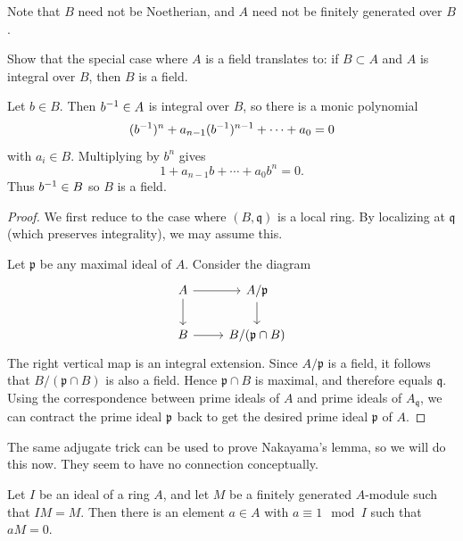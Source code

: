 \documentclass[12pt]{article}
\begin{document}
Note that $B$ need not be Noetherian, and $A$ need not be finitely generated over $B$.



\begin{exercise}
    Show that the special case where $A$ is a field translates to: if $B \subset A$ and $A$ is integral over $B$, then $B$ is a field.
\end{exercise}

\begin{solution}
    Let $b\in B$. Then ${b}^{-1}\in A$ is integral over $B$, so there is a monic polynomial
    \[({b}^{-1})^n + a_{n-1}({b}^{-1})^{n-1} + \cdots + a_0 = 0\]
    with $a_i\in B$. Multiplying by $b^n$ gives
    \[1 + a_{n-1}b + \cdots + a_0 b^n = 0.\]
    Thus ${b}^{-1} \in B$ so $B$ is a field.
\end{solution}

\begin{proof}
    We first reduce to the case where $(B,\mathfrak q)$ is a local ring. By localizing at $\mathfrak q$ (which preserves integrality), we may assume this.

    Let $\mathfrak p$ be any maximal ideal of $A$. Consider the diagram
    \[
        \begin{tikzcd}
            A \arrow[r] \arrow[d] & A/\mathfrak p \arrow[d] \\
            B \arrow[r] & B/(\mathfrak p \cap B)
        \end{tikzcd}
    \]
    The right vertical map is an integral extension. Since $A/\mathfrak p$ is a field, it follows that $B/(\mathfrak p \cap B)$ is also a field. Hence $\mathfrak p \cap B$ is maximal, and therefore equals $\mathfrak q$. Using the correspondence between prime ideals of $A$ and prime ideals of $A_{\mathfrak q}$, we can contract the prime ideal $\mathfrak{p}$ back to get the desired prime ideal $\mathfrak p$ of $A$.
\end{proof}

The same adjugate trick can be used to prove Nakayama's lemma, so we will do this now. They seem to have no connection conceptually.

\begin{lemma}
     Let $I$ be an ideal of a ring $A$, and let $M$ be a finitely generated $A$-module such that $IM=M$. Then there is an element $a\in A$ with $a\equiv 1 \mod I$ such that $aM=0$.
\end{lemma}
\end{document}
